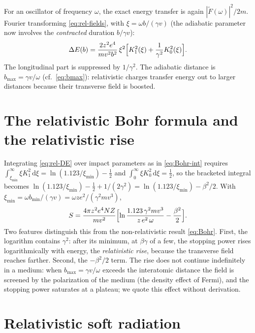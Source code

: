 \documentclass[11pt,a4paper]{book}
\numberwithin{equation}{chapter}
\newcommand{\dd}{\mathrm{d}}
\begin{document}
For an oscillator of frequency $\omega$, the exact energy transfer is again
$|\tilde F(\omega)|^2/2m$. Fourier transforming \eqref{eq:rel-fields}, with
$\xi=\omega b/(\gamma v)$ (the adiabatic parameter now involves the
\emph{contracted} duration $b/\gamma v$):
\begin{equation}\label{eq:rel-DE}
  \Delta E(b)=\frac{2z^2e^4}{mv^2b^2}\,\xi^2\Bigl[K_1^2(\xi)+\frac1{\gamma^2}K_0^2(\xi)\Bigr].
\end{equation}
The longitudinal part is suppressed by $1/\gamma^2$. The adiabatic distance is
$b_{\max}=\gamma v/\omega$ (cf.\ \eqref{eq:bmax}): relativistic charges transfer
energy out to larger distances because their transverse field is boosted.

\section{The relativistic Bohr formula and the relativistic rise}

Integrating \eqref{eq:rel-DE} over impact parameters as in \eqref{eq:Bohr-int}
requires $\int_{\xi_{\min}}^\infty\xi K_1^2\,\dd\xi=\ln(1.123/\xi_{\min})-\tfrac12$
and $\int_0^\infty\xi K_0^2\,\dd\xi=\tfrac12$, so the bracketed integral becomes
$\ln(1.123/\xi_{\min})-\tfrac12+1/(2\gamma^2)=\ln(1.123/\xi_{\min})-\beta^2/2$. With
$\xi_{\min}=\omega b_{\min}/(\gamma v)=\omega ze^2/(\gamma^2mv^3)$,
\begin{equation}\label{eq:rel-Bohr}
  S=\frac{4\pi z^2e^4NZ}{mv^2}\Bigl[\ln\frac{1.123\,\gamma^2mv^3}{z\,e^2\,\omega}
  -\frac{\beta^2}{2}\Bigr].
\end{equation}
Two features distinguish this from the non-relativistic result \eqref{eq:Bohr}.
First, the logarithm contains $\gamma^2$: after its minimum, at $\beta\gamma$ of a few, the stopping power rises logarithmically with energy, the
\emph{relativistic rise}, because the transverse field reaches farther. Second,
the $-\beta^2/2$ term. The rise does not continue indefinitely in a medium: when
$b_{\max}=\gamma v/\omega$ exceeds the interatomic distance the field is screened
by the polarization of the medium (the density effect of Fermi), and the
stopping power saturates at a plateau; we quote this effect without derivation.

\section{Relativistic soft radiation}\label{sec:rel-soft}
\end{document}
